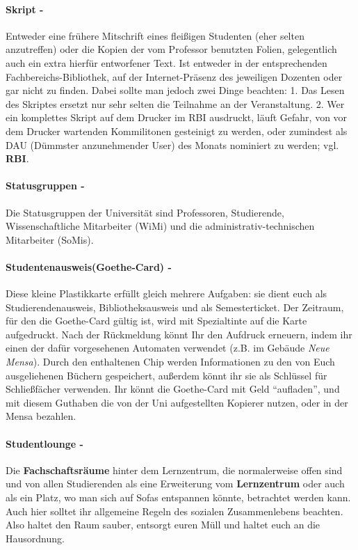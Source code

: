 \paragraph{Skript -} Entweder eine frühere Mitschrift eines fleißigen Studenten (eher selten anzutreffen) oder die Kopien der vom Professor benutzten Folien, gelegentlich auch ein extra hierfür entworfener Text. Ist entweder in der entsprechenden Fachbereichs-Bibliothek, auf der Internet-Präsenz des jeweiligen Dozenten oder gar nicht zu finden. Dabei sollte man jedoch zwei Dinge beachten: 1. Das Lesen des Skriptes ersetzt nur sehr selten die Teilnahme an der Veranstaltung. 2. Wer ein komplettes Skript auf dem Drucker im RBI ausdruckt, läuft Gefahr, von vor dem Drucker wartenden Kommilitonen gesteinigt zu werden, oder zumindest als DAU (Dümmster anzunehmender User) des Monats nominiert zu werden; vgl. \textbf{RBI}.
\paragraph{Statusgruppen -} Die Statusgruppen der Universität sind Professoren, Studierende, Wissenschaftliche Mitarbeiter (WiMi) und die administrativ-technischen Mitarbeiter (SoMis).
\paragraph{Studentenausweis(Goethe-Card) -} Diese kleine Plastikkarte erfüllt gleich mehrere Aufgaben: sie dient euch als Studierendenausweis, Bibliotheksausweis und als Semesterticket. Der Zeitraum, für den die Goethe-Card gültig ist, wird mit Spezialtinte auf die Karte aufgedruckt. Nach der Rückmeldung könnt Ihr den Aufdruck erneuern, indem ihr einen der dafür vorgesehenen Automaten verwendet (z.B. im Gebäude \textit{Neue Mensa}). Durch den enthaltenen Chip werden Informationen zu den von Euch ausgeliehenen Büchern gespeichert, außerdem könnt ihr sie als Schlüssel für Schließfächer verwenden. Ihr könnt die Goethe-Card mit Geld ``aufladen'', und mit diesem Guthaben die von der Uni aufgestellten Kopierer nutzen, oder in der Mensa bezahlen.
\paragraph{Studentlounge -} Die \textbf{Fachschaftsräume} hinter dem Lernzentrum, die normalerweise offen sind und von allen Studierenden als eine Erweiterung vom \textbf{Lernzentrum} oder auch als ein Platz, wo man sich auf Sofas entspannen könnte, betrachtet werden kann. Auch hier solltet ihr allgemeine Regeln des sozialen Zusammenlebens beachten. Also haltet den Raum sauber, entsorgt euren Müll und haltet euch an die Hausordnung.

